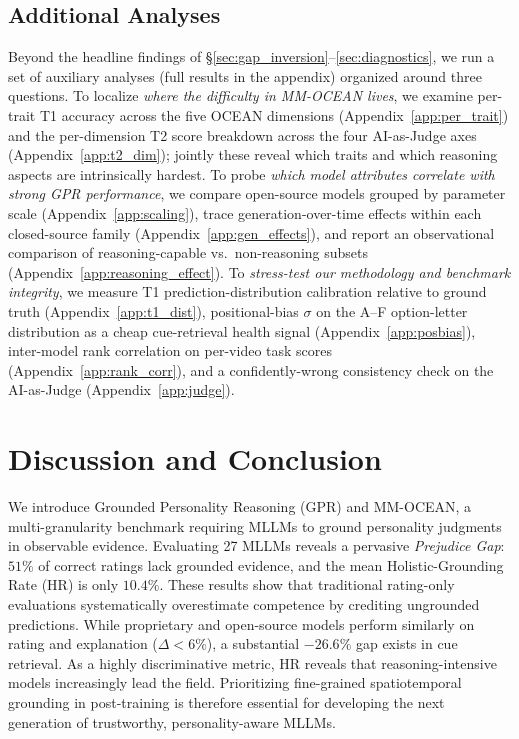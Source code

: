 \documentclass{article}
\newcommand{\taskname}{Grounded Personality Reasoning}
\newcommand{\taskabbr}{GPR}
\newcommand{\benchname}{MM-OCEAN}
\newcommand{\gapinv}{Prejudice Gap}
\begin{document}
\subsection{Additional Analyses}
\label{sec:additional}

Beyond the headline findings of \S\ref{sec:gap_inversion}--\ref{sec:diagnostics}, we run a set of auxiliary analyses (full results in the appendix) organized around three questions. To localize \emph{where the difficulty in \benchname{} lives}, we examine per-trait T1 accuracy across the five OCEAN dimensions (Appendix~\ref{app:per_trait}) and the per-dimension T2 score breakdown across the four AI-as-Judge axes (Appendix~\ref{app:t2_dim}); jointly these reveal which traits and which reasoning aspects are intrinsically hardest. To probe \emph{which model attributes correlate with strong \taskabbr{} performance}, we compare open-source models grouped by parameter scale (Appendix~\ref{app:scaling}), trace generation-over-time effects within each closed-source family (Appendix~\ref{app:gen_effects}), and report an observational comparison of reasoning-capable vs.\ non-reasoning subsets (Appendix~\ref{app:reasoning_effect}). To \emph{stress-test our methodology and benchmark integrity}, we measure T1 prediction-distribution calibration relative to ground truth (Appendix~\ref{app:t1_dist}), positional-bias $\sigma$ on the A--F option-letter distribution as a cheap cue-retrieval health signal (Appendix~\ref{app:posbias}), inter-model rank correlation on per-video task scores (Appendix~\ref{app:rank_corr}), and a confidently-wrong consistency check on the AI-as-Judge (Appendix~\ref{app:judge}).

\section{Discussion and Conclusion}
\label{sec:conclusion}

We introduce \taskname{} (\taskabbr{}) and \benchname{}, a multi-granularity benchmark requiring MLLMs to ground personality judgments in observable evidence. Evaluating 27 MLLMs reveals a pervasive \emph{\gapinv{}}: $51\%$ of correct ratings lack grounded evidence, and the mean Holistic-Grounding Rate (HR) is only $10.4\%$. These results show that traditional rating-only evaluations systematically overestimate competence by crediting ungrounded predictions. While proprietary and open-source models perform similarly on rating and explanation ($\Delta < 6\%$), a substantial $-26.6\%$ gap exists in cue retrieval. As a highly discriminative metric, HR reveals that reasoning-intensive models increasingly lead the field. Prioritizing fine-grained spatiotemporal grounding in post-training is therefore essential for developing the next generation of trustworthy, personality-aware MLLMs.
\end{document}
